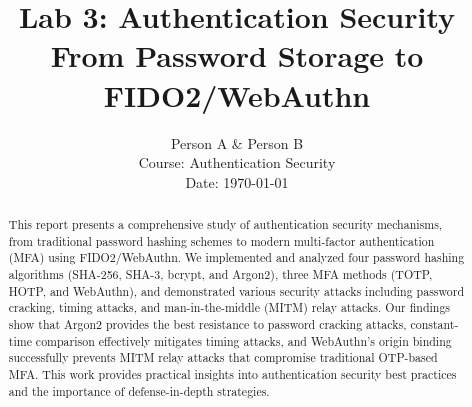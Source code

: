 \documentclass[12pt,a4paper]{article}
\title{\textbf{Lab 3: Authentication Security\\From Password Storage to FIDO2/WebAuthn}}
\author{Person A \& Person B\\
Course: Authentication Security\\
Date: \today}
\date{}
\begin{document}
\maketitle
\thispagestyle{empty}

\begin{abstract}
This report presents a comprehensive study of authentication security mechanisms, from traditional password hashing schemes to modern multi-factor authentication (MFA) using FIDO2/WebAuthn. We implemented and analyzed four password hashing algorithms (SHA-256, SHA-3, bcrypt, and Argon2), three MFA methods (TOTP, HOTP, and WebAuthn), and demonstrated various security attacks including password cracking, timing attacks, and man-in-the-middle (MITM) relay attacks. Our findings show that Argon2 provides the best resistance to password cracking attacks, constant-time comparison effectively mitigates timing attacks, and WebAuthn's origin binding successfully prevents MITM relay attacks that compromise traditional OTP-based MFA. This work provides practical insights into authentication security best practices and the importance of defense-in-depth strategies.
\end{abstract}

\newpage
\tableofcontents
\newpage
\end{document}
